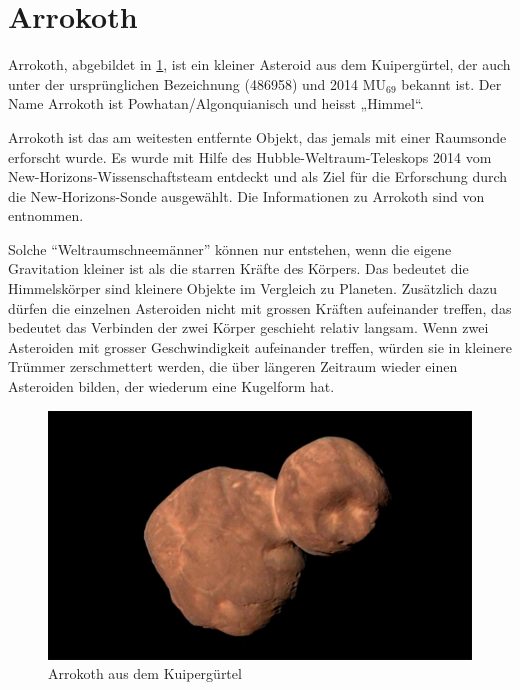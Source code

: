 %
%
%
%
\section{Arrokoth
\label{planet:section:arrokoth}}
Arrokoth, abgebildet in \cref{planet:fig:arrokoth}, ist ein kleiner Asteroid aus dem Kuipergürtel, der auch unter der ursprünglichen Bezeichnung (486958) und 2014 \(\text{MU}_{69}\) bekannt ist.
%
%
Der Name Arrokoth ist Powhatan/Algonquianisch und heisst „Himmel“.

Arrokoth ist das am weitesten entfernte Objekt, das jemals mit einer Raumsonde erforscht wurde.
Es wurde mit Hilfe des Hubble-Weltraum-Teleskops 2014 vom New-Horizons-Wissenschaftsteam entdeckt und als Ziel für die Erforschung durch die New-Horizons-Sonde ausgewählt.
%
Die Informationen zu Arrokoth sind von \cite{planet:arrokoth} entnommen.

Solche ``Weltraumschneemänner'' können nur entstehen, wenn die eigene Gravitation kleiner ist als die starren Kräfte des Körpers.
%
Das bedeutet die Himmelskörper sind kleinere Objekte im Vergleich zu Planeten.
Zusätzlich dazu dürfen die einzelnen Asteroiden nicht mit grossen
Kräften aufeinander treffen, das bedeutet das Verbinden der zwei
Körper geschieht relativ langsam.
Wenn zwei Asteroiden mit grosser Geschwindigkeit aufeinander treffen, würden sie in kleinere Trümmer zerschmettert werden, die über längeren Zeitraum wieder einen Asteroiden bilden, der wiederum eine Kugelform hat.
\begin{figure}
    \centering
    \includegraphics[width=\linewidth]{papers/planet/pictures/Arrokoth.pdf}
    \caption{Arrokoth aus dem Kuipergürtel \cite{planet:arrokothpic}
        \label{planet:fig:arrokoth}}
\end{figure}
